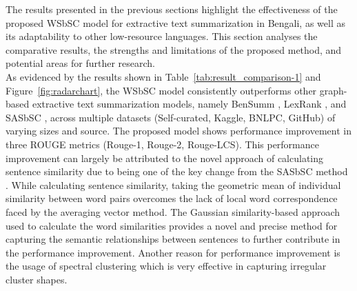 The results presented in the previous sections highlight the effectiveness of the proposed WSbSC model for extractive text summarization in Bengali, as well as its adaptability to other low-resource languages. This section analyses the comparative results, the strengths and limitations of the proposed method, and potential areas for further research.\\

As evidenced by the results shown in Table~\ref{tab:result_comparison-1} and Figure~\ref{fig:radarchart}, the WSbSC model consistently outperforms other graph-based extractive text summarization models, namely BenSumm \cite{das-2022-tfidf}, LexRank \cite{Erkan-lexRank-2004}, and SASbSC \cite{roychowdhury-etal-2022-spectral-base}, across multiple datasets (Self-curated, Kaggle, BNLPC, GitHub) of varying sizes and source. The proposed model shows performance improvement in three ROUGE metrics (Rouge-1, Rouge-2, Rouge-LCS). This performance improvement can largely be attributed to the novel approach of calculating sentence similarity due to being one of the key change from the SASbSC method \cite{roychowdhury-etal-2022-spectral-base}. While calculating sentence similarity, taking the geometric mean of individual similarity between word pairs overcomes the lack of local word correspondence faced by the averaging vector method. The Gaussian similarity-based approach used to calculate the word similarities provides a novel and precise method for capturing the semantic relationships between sentences to further contribute in the performance improvement. Another reason for performance improvement is the usage of spectral clustering which is very effective in capturing irregular cluster shapes.\\

